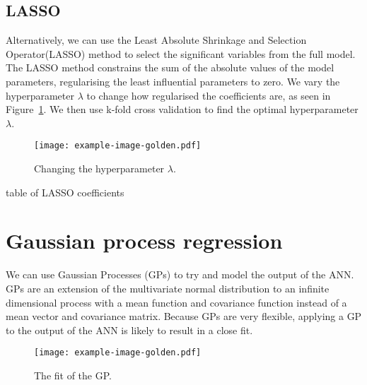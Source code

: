 \subsection{LASSO}

Alternatively, we can use the Least Absolute Shrinkage and Selection Operator(LASSO) method to select the significant variables from the full model.
The LASSO method constrains the sum of the absolute values of the model parameters, regularising the least influential parameters to zero.
We vary the hyperparameter \(\lambda\) to change how regularised the coefficients are, as seen in Figure~\ref{fig:lasso-lambda}.
We then use k-fold cross validation to find the optimal hyperparameter \(\lambda\).

\begin{figure}[htbp]
	\centering
	\texttt{[image: example-image-golden.pdf]}
	\caption{Changing the hyperparameter \(\lambda\).}
	\label{fig:lasso-lambda}
\end{figure}

\begin{todo}
	table of LASSO coefficients
\end{todo}

\section{Gaussian process regression}

We can use Gaussian Processes (GPs) to try and model the output of the ANN.
GPs are an extension of the multivariate normal distribution to an infinite dimensional process with a mean function and covariance function instead of a mean vector and covariance matrix.
Because GPs are very flexible, applying a GP to the output of the ANN is likely to result in a close fit.

\begin{figure}[htbp]
	\centering
	\texttt{[image: example-image-golden.pdf]}
	\caption{The fit of the GP.}
	\label{fig:gp-fit}
\end{figure}

